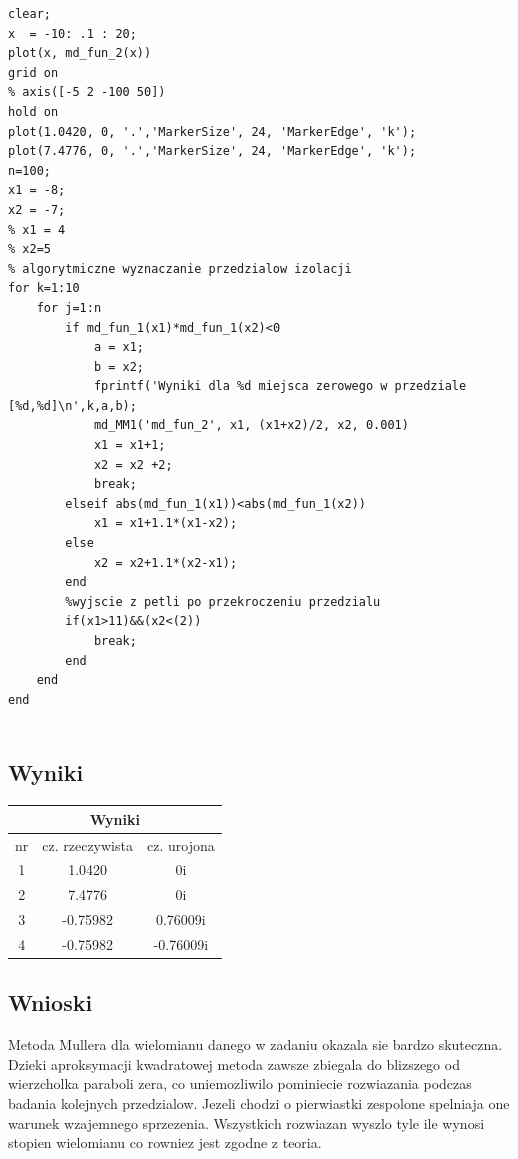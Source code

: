 \documentclass[polish, 11pt, oneside]{article}   	%
\begin{document}
\begin{lstlisting}[caption=Skrypt rozwiazujacy zadanie nr 2]
%skrypt generujacy wyniki do zadania 2
clear;
x  = -10: .1 : 20;
plot(x, md_fun_2(x))
grid on
% axis([-5 2 -100 50])
hold on
plot(1.0420, 0, '.','MarkerSize', 24, 'MarkerEdge', 'k');
plot(7.4776, 0, '.','MarkerSize', 24, 'MarkerEdge', 'k');
n=100; 
x1 = -8; 
x2 = -7; 
% x1 = 4
% x2=5
% algorytmiczne wyznaczanie przedzialow izolacji
for k=1:10
    for j=1:n
        if md_fun_1(x1)*md_fun_1(x2)<0
            a = x1;
            b = x2;
            fprintf('Wyniki dla %d miejsca zerowego w przedziale [%d,%d]\n',k,a,b);
            md_MM1('md_fun_2', x1, (x1+x2)/2, x2, 0.001)
            x1 = x1+1; 
            x2 = x2 +2; 
            break;
        elseif abs(md_fun_1(x1))<abs(md_fun_1(x2))
            x1 = x1+1.1*(x1-x2);
        else
            x2 = x2+1.1*(x2-x1);
        end
        %wyjscie z petli po przekroczeniu przedzialu
        if(x1>11)&&(x2<(2))
            break; 
        end
    end
end


\end{lstlisting}

\subsection{Wyniki}
\begin{center}
\begin{tabular}{ |c|c|c| } 
\hline
\multicolumn{3}{|c|}{Wyniki} \\
 \hline
 nr & cz. rzeczywista & cz. urojona \\
 \hline
  1 & 1.0420 & 0i  \\ 
  2 & 7.4776 & 0i \\ 
  3 & -0.75982 & 0.76009i \\ 
  4 & -0.75982 & -0.76009i \\ 
   \hline
\end{tabular}
\end{center}


\subsection{Wnioski}
Metoda Mullera dla wielomianu danego w zadaniu okazala sie bardzo skuteczna. Dzieki aproksymacji kwadratowej metoda zawsze zbiegala do blizszego od wierzcholka paraboli zera, co uniemozliwilo pominiecie rozwiazania podczas badania kolejnych przedzialow. Jezeli chodzi o pierwiastki zespolone spelniaja one warunek wzajemnego sprzezenia. Wszystkich rozwiazan wyszlo tyle ile wynosi stopien wielomianu co rowniez jest zgodne z teoria. 
\end{document}
